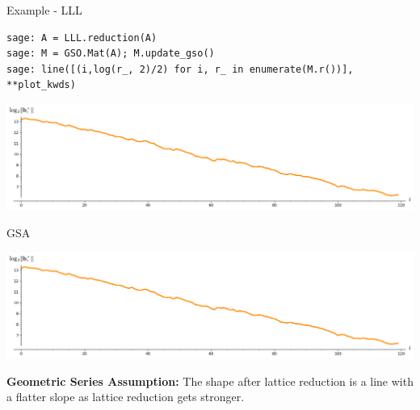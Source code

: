 \documentclass[xcolor=table,10pt,aspectratio=169]{beamer}
\begin{document}
\begin{frame}[label={sec:org5d03646},fragile]{Example - LLL}
 \lstset{language=sage,label= ,caption= ,captionpos=b,numbers=none}
\begin{lstlisting}
sage: A = LLL.reduction(A)
sage: M = GSO.Mat(A); M.update_gso()
sage: line([(i,log(r_, 2)/2) for i, r_ in enumerate(M.r())], **plot_kwds)
\end{lstlisting}

\begin{center}
\includegraphics[width=.9\linewidth]{gram-schmidt-norms-lll.png}
\end{center}
\end{frame}

\begin{frame}[label={sec:org852ead2}]{GSA}
\begin{center}
\includegraphics[width=.9\linewidth]{gram-schmidt-norms-lll.png}
\end{center}

\textbf{Geometric Series Assumption:} The shape after lattice reduction is a line with a flatter slope as lattice reduction gets stronger.
\end{frame}
\end{document}
